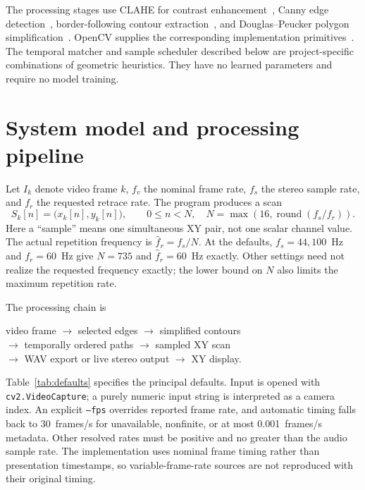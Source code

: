 \documentclass[11pt,a4paper]{article}
\newcommand{\code}[1]{\texttt{#1}}
\begin{document}
The processing stages use CLAHE for contrast enhancement~\cite{zuiderveld}, Canny edge detection~\cite{canny}, border-following contour extraction~\cite{suzuki}, and Douglas--Peucker polygon simplification~\cite{douglas}. OpenCV supplies the corresponding implementation primitives~\cite{opencvshape,opencvfilter}. The temporal matcher and sample scheduler described below are project-specific combinations of geometric heuristics. They have no learned parameters and require no model training.

\section{System model and processing pipeline}
Let $I_k$ denote video frame $k$, $f_v$ the nominal frame rate, $f_s$ the stereo sample rate, and $f_r$ the requested retrace rate. The program produces a scan
\begin{equation}
 S_k[n]=\bigl(x_k[n],y_k[n]\bigr),\qquad 0\leq n<N,
 \quad N=\max\!\left(16,\operatorname{round}(f_s/f_r)\right).
 \label{eq:scan}
\end{equation}
Here a ``sample'' means one simultaneous XY pair, not one scalar channel value. The actual repetition frequency is $\widehat f_r=f_s/N$. At the defaults, $f_s=44{,}100$~Hz and $f_r=60$~Hz give $N=735$ and $\widehat f_r=60$~Hz exactly. Other settings need not realize the requested frequency exactly; the lower bound on $N$ also limits the maximum repetition rate.

The processing chain is
\begin{center}
\small
video frame $\longrightarrow$ selected edges $\longrightarrow$ simplified contours\\[3pt]
$\longrightarrow$ temporally ordered paths $\longrightarrow$ sampled XY scan\\[3pt]
$\longrightarrow$ WAV export or live stereo output $\longrightarrow$ XY display.
\end{center}
Table~\ref{tab:defaults} specifies the principal defaults. Input is opened with \code{cv2.VideoCapture}; a purely numeric input string is interpreted as a camera index. An explicit \code{--fps} overrides reported frame rate, and automatic timing falls back to 30~frames/s for unavailable, nonfinite, or at most 0.001~frames/s metadata. Other resolved rates must be positive and no greater than the audio sample rate. The implementation uses nominal frame timing rather than presentation timestamps, so variable-frame-rate sources are not reproduced with their original timing.
\end{document}
